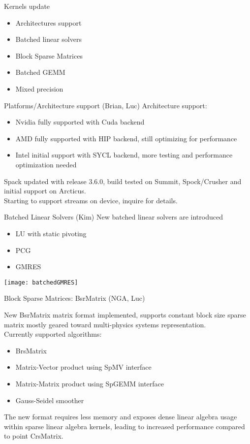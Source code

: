 \begin{frame}[fragile]
  {\Huge Kernels update}

  \begin{itemize}
  \item Architectures support
  \item Batched linear solvers
  \item Block Sparse Matrices
  \item Batched GEMM
  \item Mixed precision
  \end{itemize}

\end{frame}

\begin{frame}[fragile]{Platforms/Architecture support (Brian, Luc)}
Architecture support:
\begin{itemize}
  \item Nvidia fully supported with Cuda backend
  \item AMD fully supported with HIP backend, still optimizing for performance
  \item Intel initial support with SYCL backend, more testing and performance optimization needed
\end{itemize}
Spack updated with release 3.6.0, build tested on Summit, Spock/Crusher and initial support on Arcticus.\\
Starting to support streams on device, inquire for details.
\end{frame}

\begin{frame}[fragile]{Batched Linear Solvers (Kim)}
New batched linear solvers are introduced
\begin{itemize}
  \item LU with static pivoting
  \item PCG
  \item GMRES
\end{itemize}
\begin{center}
  \texttt{[image: batchedGMRES]}
\end{center}
\end{frame}

\begin{frame}[fragile]{Block Sparse Matrices: BsrMatrix (NGA, Luc)}

New BsrMatrix matrix format implemented, supports constant block size sparse matrix mostly geared toward multi-physics systems representation.\\
Currently supported algorithms:
\begin{itemize}
  \item BrsMatrix
  \item Matrix-Vector product using SpMV interface
  \item Matrix-Matrix product using SpGEMM interface
  \item Gauss-Seidel smoother
\end{itemize}
The new format requires less memory and exposes dense linear algebra usage within sparse linear algebra kernels, leading to increased performance compared to point CrsMatrix.

\end{frame}

